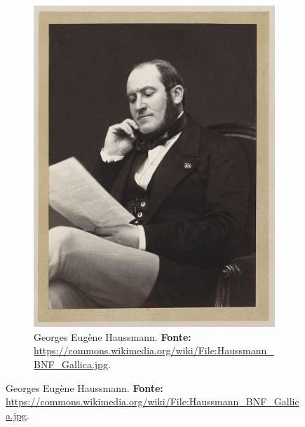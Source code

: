 \begin{figure}
\begin{footnotesize}
\begin{subfigure}[b]{0.4\linewidth}
		\includegraphics[width=1\textwidth]{2-cap1/complementos/fotos/haussmann.jpg}  
		\caption{Georges Eugène Haussmann. \textbf{Fonte:} \url{https://commons.wikimedia.org/wiki/File:Haussmann_BNF_Gallica.jpg}.}
		\label{fig:haussmann}
	\end{subfigure}	
\end{footnotesize}
\end{figure}

